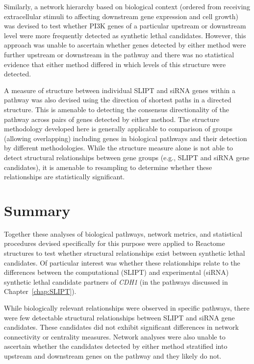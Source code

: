 Similarly, a network hierarchy based on biological context (ordered from receiving extracellular stimuli to affecting downstream \gls{gene expression} and cell growth) was devised to test whether \gls{PI3K} genes of a particular upstream or downstream level were more frequently detected as \gls{synthetic lethal} candidates. However, this approach was unable to ascertain whether genes detected by either method were further upstream or downstream in the pathway and there was no statistical evidence that either method differed in which levels of this structure were detected.

A measure of  structure between individual \gls{SLIPT} and \gls{siRNA} genes within a pathway was also devised using the direction of \glspl{shortest path} in a directed  structure. This is amenable to detecting the consensus directionality of the pathway across pairs of genes detected by either method. The  structure methodology developed here is generally applicable to comparison of  groups (allowing overlapping) including genes in biological pathways and their detection by different methodologies. While the  structure measure alone is not able to detect structural relationships between gene groups (e.g., \gls{SLIPT} and \gls{siRNA} gene candidates), it is amenable to resampling to determine whether these relationships are statistically significant.

\section{Summary}

Together these analyses of biological pathways, network metrics, and statistical procedures devised specifically for this purpose were applied to Reactome  structures to test whether structural relationships exist between \gls{synthetic lethal} candidates. Of particular interest was whether these relationships relate to the differences between the computational (\gls{SLIPT}) and experimental (\gls{siRNA}) \gls{synthetic lethal} candidate partners of \textit{CDH1} (in the pathways discussed in Chapter~\ref{chap:SLIPT}).

While biologically relevant relationships were observed in specific pathways, there were few detectable structural relationships between \gls{SLIPT} and \gls{siRNA} gene candidates. These candidates did not exhibit significant differences in network connectivity or \gls{centrality} measures. Network analyses were also unable to ascertain whether the candidates detected by either method stratified into upstream and downstream genes on the pathway and they likely do not.


